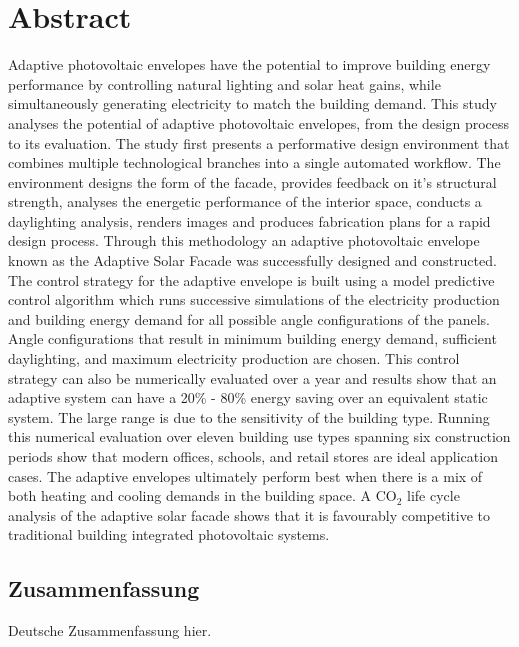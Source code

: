 \begingroup
\let\clearpage\relax
\let\cleardoublepage\relax
\let\cleardoublepage\relax

\chapter*{Abstract}

Adaptive photovoltaic envelopes have the potential to improve building energy performance by controlling natural lighting and solar heat gains, while simultaneously generating electricity to match the building demand. This study analyses the potential of adaptive photovoltaic envelopes, from the design process to its evaluation. The study first presents a performative design environment that combines multiple technological branches into a single automated workflow. The environment designs the form of the facade, provides feedback on it's structural strength, analyses the energetic performance of the interior space, conducts a daylighting analysis, renders images and produces fabrication plans for a rapid design process. Through this methodology an adaptive photovoltaic envelope known as the Adaptive Solar Facade was successfully designed and constructed. The control strategy for the adaptive envelope is built using a model predictive control algorithm which runs successive simulations of the electricity production and building energy demand for all possible angle configurations of the panels. Angle configurations that result in minimum building energy demand, sufficient daylighting, and maximum electricity production are chosen. This control strategy can also be numerically evaluated over a year and results show that an adaptive system can have a 20\% - 80\% energy saving over an equivalent static system. The large range is due to the sensitivity of the building type. Running this numerical evaluation over eleven building use types spanning six construction periods show that modern offices, schools, and retail stores are ideal application cases. The adaptive envelopes ultimately perform best when there is a mix of both heating and cooling demands in the building space. A CO$_2$ life cycle analysis of the adaptive solar facade shows that it is favourably competitive to traditional building integrated photovoltaic systems.

\endgroup

\cleardoublepage%

\begingroup
\let\clearpage\relax
\let\cleardoublepage\relax
\let\cleardoublepage\relax

\begin{otherlanguage}{ngerman}
\chapter*{Zusammenfassung}

Deutsche Zusammenfassung hier.

\end{otherlanguage}

\endgroup

\vfill